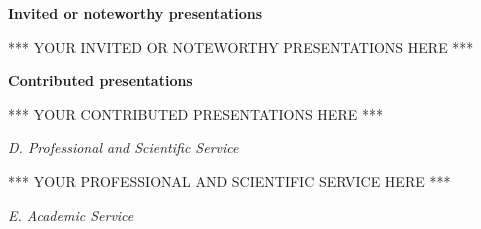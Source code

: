 \documentclass[12pt]{article}
\begin{document}
\vspace{10pt}
\raggedright \textbf{Invited or noteworthy presentations} \\
\vspace{10pt}





*** YOUR INVITED OR NOTEWORTHY PRESENTATIONS HERE ***





\vspace{10pt}
\raggedright \textbf{Contributed presentations} \\
\vspace{10pt}





*** YOUR CONTRIBUTED PRESENTATIONS HERE ***





\begin{comment}

For bullets, use this code:
\begin{itemize}
	\item FIRST
	\item SECOND
	\item THIRD
\end{itemize}

For numbered lists, use this code:
\begin{enumerate}
	\item FIRST
	\item SECOND
	\item THIRD
\end{enumerate}

\end{comment}

\vspace{10pt}
\raggedright \large \textit{D. Professional and Scientific Service} \\
\normalsize
\vspace{10pt}





*** YOUR PROFESSIONAL AND SCIENTIFIC SERVICE HERE ***





\vspace{10pt}
\raggedright \large \textit{E. Academic Service} \\
\normalsize
\end{document}
